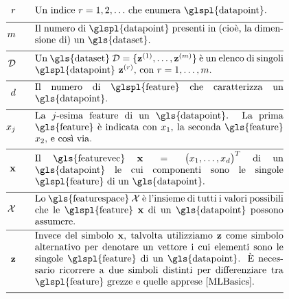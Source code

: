\begin{align}
	\sampleidx \quad\quad & \parbox{.75\textwidth}{Un indice $\sampleidx=1,2,\ldots$ che enumera \glspl{datapoint}.}   \nonumber \\[2mm] \hline \nonumber\\[-5mm]
	\samplesize \quad\quad &\parbox{.75\textwidth}{Il numero di  \glspl{datapoint} presenti in (cioè, la dimensione di) un \gls{dataset}.} \nonumber \\[2mm] \hline \nonumber\\[-5mm] 
	\dataset \quad\quad & \parbox{.75\textwidth}{Un \gls{dataset} $\dataset = \{ \datapoint^{(1)},\ldots, \datapoint^{(\samplesize)} \}$ 
		è un elenco di singoli \glspl{datapoint} $\datapoint^{(\sampleidx)}$, con $\sampleidx=1,\ldots,\samplesize$.}   \nonumber \\[2mm] \hline \nonumber\\[-5mm]
	\featurelen \quad\quad &\parbox{.75\textwidth}{Il numero di \glspl{feature} che caratterizza un \gls{datapoint}.}\nonumber \\[2mm] \hline \nonumber\\[-5mm]
	\feature_{\featureidx} \quad\quad &\parbox{.75\textwidth}{La $\featureidx$-esima feature di un \gls{datapoint}. La prima \gls{feature} 
		è indicata con $\feature_{1}$, la seconda \gls{feature} $\feature_{2}$, e così via. } \nonumber \\[2mm] \hline \nonumber\\[-5mm] 
	\featurevec \quad\quad &\parbox{.75\textwidth}{Il \gls{featurevec} $\featurevec=\big(\feature_{1},\ldots,\feature_{\featuredim}\big)^{T}$ di un \gls{datapoint} le cui componenti sono le singole \glspl{feature} di un \gls{datapoint}.}\nonumber \\[2mm] \hline \nonumber\\[-5mm]
	\featurespace \quad\quad & \parbox{.75\textwidth}{Lo \gls{featurespace} $\featurespace$ è l'insieme di tutti i valori possibili che le \glspl{feature} $\featurevec$ di un \gls{datapoint} possono assumere.} \nonumber \\[2mm] \hline \nonumber\\[-5mm]
	\rawfeaturevec \quad\quad &\parbox{.75\textwidth}{Invece del simbolo $\featurevec$, talvolta utilizziamo $\rawfeaturevec$ come simbolo alternativo per denotare un vettore i cui elementi sono le singole \glspl{feature} di un \gls{datapoint}. È necessario ricorrere a due simboli distinti per differenziare tra \glspl{feature} grezze e quelle apprese \cite[Ch. 9]{MLBasics}.}\nonumber \\[2mm] \hline \nonumber\\[-5mm]

\end{align}
